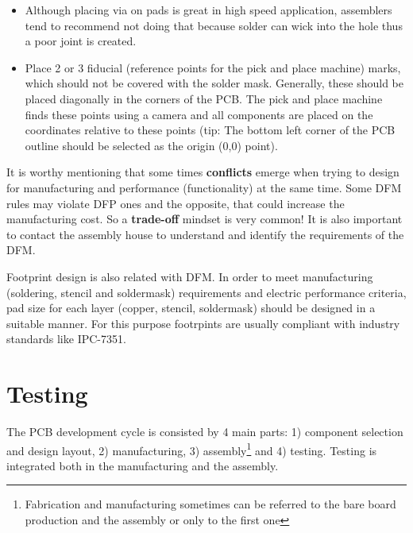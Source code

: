 \documentclass[12pt]{article}
\begin{document}
\begin{itemize}
	\item Although placing via on pads is great in high speed application, assemblers tend to recommend not doing that because solder can wick into the hole thus a poor joint is created.
	
	
	\item Place 2 or 3 fiducial (reference points for the pick and place machine) marks, which should not be covered with the solder mask. Generally, these should be placed diagonally in the corners of the PCB. The pick and place machine finds these points using a camera and all components are placed on the coordinates relative to these points (tip: The bottom left corner of the PCB outline should be selected as the origin (0,0) point). 
	
	
\end{itemize}

It is worthy mentioning that some times \textbf{conflicts} emerge when trying to design for manufacturing and performance (functionality) at the same time. Some DFM rules may violate DFP ones and the opposite, that could increase the manufacturing cost. So a \textbf{trade-off} mindset is very common! It is also important to contact the assembly house to understand and identify the requirements of the DFM.

Footprint design is also related with DFM. In order to meet manufacturing (soldering, stencil and soldermask) requirements and electric performance criteria, pad size for each layer (copper, stencil, soldermask) should be designed in a suitable manner. For this purpose footrpints are usually compliant with industry standards like IPC-7351.

\section{Testing}

The PCB development cycle is consisted by 4 main parts: 1) component selection and design layout, 2) manufacturing, 3) assembly\footnote{Fabrication and manufacturing sometimes can be referred to the bare board production and the assembly or only to the first one} and 4) testing. Testing is integrated both in the manufacturing and the assembly.
\end{document}
